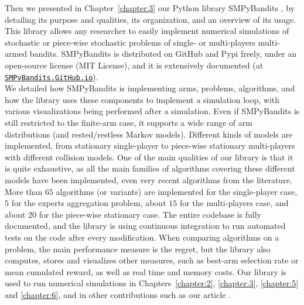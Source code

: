 Then we presented in Chapter~\ref{chapter:3} our Python library SMPyBandits \cite{SMPyBanditsJMLR,SMPyBandits}, by detailing
its purpose and qualities, its organization, and an overview of its usage.
%
This library allows any researcher to easily implement numerical simulations of stochastic or piece-wise stochastic problems of single- or multi-players multi-armed bandits.
SMPyBandits is distributed on GitHub and Pypi freely, under an open-source license (MIT License), and it is extensively documented (at \href{https://SMPyBandits.GitHub.io}{\texttt{SMPyBandits.GitHub.io}}).\\
\indent
We detailed how SMPyBandits is implementing arms, problems, algorithms, and how the library uses these components to implement a simulation loop, with various visualizations being performed after a simulation.
Even if SMPyBandits is still restricted to the finite-arm case, it supports a wide range of arm distributions (and rested/restless Markov models).
Different kinds of models are implemented, from stationary single-player to piece-wise stationary multi-players with different collision models.
One of the main qualities of our library is that it is quite exhaustive, as all the main families of algorithms covering these different models have been implemented, even very recent algorithms from the literature.
More than $65$ algorithms (or variants) are implemented for the single-player case, $5$ for the experts aggregation problem, about $15$ for the multi-players case, and about $20$ for the piece-wise stationary case.
The entire codebase is fully documented, and the library is using continuous integration to run automated tests on the code after every modification.
%
When comparing algorithms on a problem, the main performance measure is the regret, but the library also computes, stores and visualizes other measures, such as best-arm selection rate or mean cumulated reward, as well as real time and memory costs.
%
Our library is used to run numerical simulations in Chapters~\ref{chapter:2}, \ref{chapter:3}, \ref{chapter:5} and \ref{chapter:6}, and in other contributions such as our article \cite{Besson2018DoublingTricks}.


